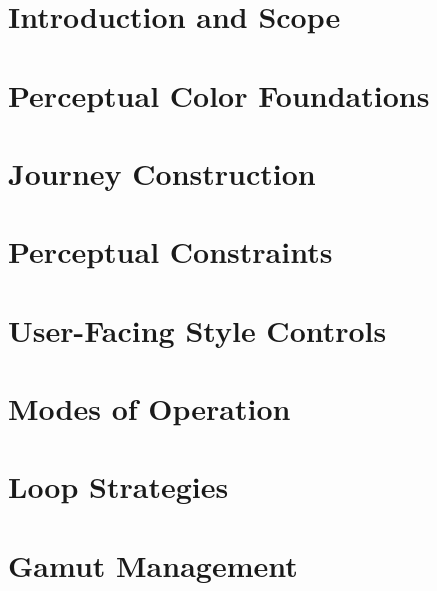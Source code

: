 \newpage

\tableofcontents

\newpage


\chapter{Introduction and Scope}


\chapter{Perceptual Color Foundations}


\chapter{Journey Construction}


\chapter{Perceptual Constraints}


\chapter{User-Facing Style Controls}


\chapter{Modes of Operation}


\chapter{Loop Strategies}


\chapter{Gamut Management}


